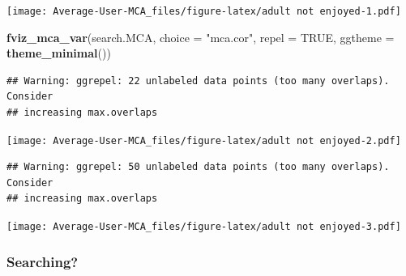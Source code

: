 \documentclass[
]{article}
\newenvironment{Shaded}{\begin{snugshade}}{\end{snugshade}}
\newcommand{\DataTypeTok}[1]{\textcolor[rgb]{0.13,0.29,0.53}{#1}}
\newcommand{\KeywordTok}[1]{\textcolor[rgb]{0.13,0.29,0.53}{\textbf{#1}}}
\newcommand{\NormalTok}[1]{#1}
\newcommand{\OtherTok}[1]{\textcolor[rgb]{0.56,0.35,0.01}{#1}}
\newcommand{\StringTok}[1]{\textcolor[rgb]{0.31,0.60,0.02}{#1}}
\begin{document}
\texttt{[image: Average-User-MCA\_files/figure-latex/adult not enjoyed-1.pdf]}

\begin{Shaded}
\begin{Highlighting}[]
\KeywordTok{fviz_mca_var}\NormalTok{(search.MCA, }\DataTypeTok{choice =} \StringTok{"mca.cor"}\NormalTok{, }\DataTypeTok{repel =} \OtherTok{TRUE}\NormalTok{,}
             \DataTypeTok{ggtheme =} \KeywordTok{theme_minimal}\NormalTok{())}
\end{Highlighting}
\end{Shaded}

\begin{verbatim}
## Warning: ggrepel: 22 unlabeled data points (too many overlaps). Consider
## increasing max.overlaps
\end{verbatim}

\texttt{[image: Average-User-MCA\_files/figure-latex/adult not enjoyed-2.pdf]}

\begin{Shaded}
\end{Shaded}

\begin{verbatim}
## Warning: ggrepel: 50 unlabeled data points (too many overlaps). Consider
## increasing max.overlaps
\end{verbatim}

\texttt{[image: Average-User-MCA\_files/figure-latex/adult not enjoyed-3.pdf]}

\hypertarget{searching-2}{%
\subsubsection{Searching?}\label{searching-2}}
\end{document}
